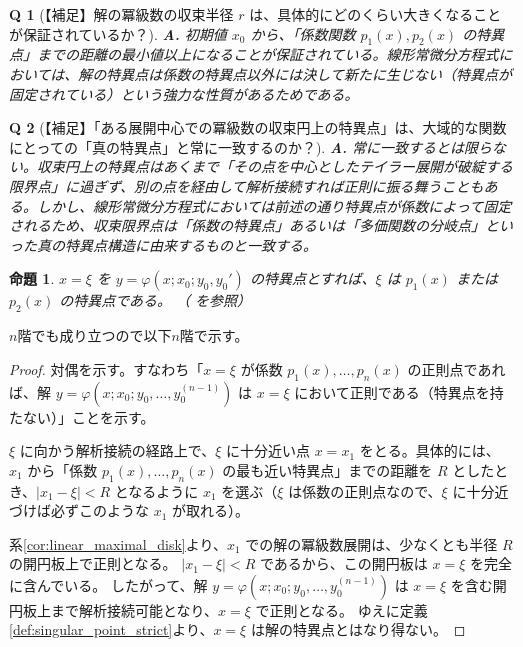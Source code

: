 \documentclass[paper=a4, fontsize=11pt]{jlreq} %
\theoremstyle{break}
\newtheorem{proposition}[theorem]{命題}
\theoremstyle{qa}
\newtheorem*{Q}{Q}
\theoremstyle{remark} %
\begin{document}
\begin{Q}[【補足】解の冪級数の収束半径 $r$ は、具体的にどのくらい大きくなることが保証されているか？]
\textbf{A.} 初期値 $x_0$ から、「係数関数 $p_1(x), p_2(x)$ の特異点」までの距離の最小値以上になることが保証されている。線形常微分方程式においては、解の特異点は係数の特異点以外には決して新たに生じない（特異点が固定されている）という強力な性質があるためである。
\end{Q}

\begin{Q}[【補足】「ある展開中心での冪級数の収束円上の特異点」は、大域的な関数にとっての「真の特異点」と常に一致するのか？]
\textbf{A.} 常に一致するとは限らない。収束円上の特異点はあくまで「その点を中心としたテイラー展開が破綻する限界点」に過ぎず、別の点を経由して解析接続すれば正則に振る舞うこともある。しかし、線形常微分方程式においては前述の通り特異点が係数によって固定されるため、収束限界点は「係数の特異点」あるいは「多価関数の分岐点」といった真の特異点構造に由来するものと一致する。
\end{Q}
\begin{proposition}\label{prop:linear_ode_singularities_fixed}
    $x=\xi$ を $y=\varphi(x;x_{0};y_{0},y_{0}')$ の特異点とすれば、$\xi$ は $p_{1}(x)$ または $p_{2}(x)$ の特異点である。
    （\cite[p.50 命題2.1]{book:okamoto} を参照）
\end{proposition}

$n$階でも成り立つので以下$n$階で示す。

\begin{proof}
    対偶を示す。すなわち「$x=\xi$ が係数 $p_{1}(x),\dots,p_{n}(x)$ の正則点であれば、解 $y=\varphi(x;x_{0};y_{0},\dots,y_{0}^{(n-1)})$ は $x=\xi$ において正則である（特異点を持たない）」ことを示す。

    $\xi$ に向かう解析接続の経路上で、$\xi$ に十分近い点 $x=x_{1}$ をとる。具体的には、$x_{1}$ から「係数 $p_1(x),\dots,p_n(x)$ の最も近い特異点」までの距離を $R$ としたとき、$|x_1 - \xi| < R$ となるように $x_1$ を選ぶ（$\xi$ は係数の正則点なので、$\xi$ に十分近づけば必ずこのような $x_1$ が取れる）。

    系\ref{cor:linear_maximal_disk}より、$x_1$ での解の冪級数展開は、少なくとも半径 $R$ の開円板上で正則となる。
    $|x_1 - \xi| < R$ であるから、この開円板は $x=\xi$ を完全に含んでいる。
    したがって、解 $y=\varphi(x;x_{0};y_{0},\dots,y_{0}^{(n-1)})$ は $x=\xi$ を含む開円板上まで解析接続可能となり、$x=\xi$ で正則となる。
    ゆえに定義\ref{def:singular_point_strict}より、$x=\xi$ は解の特異点とはなり得ない。
\end{proof}
\end{document}
